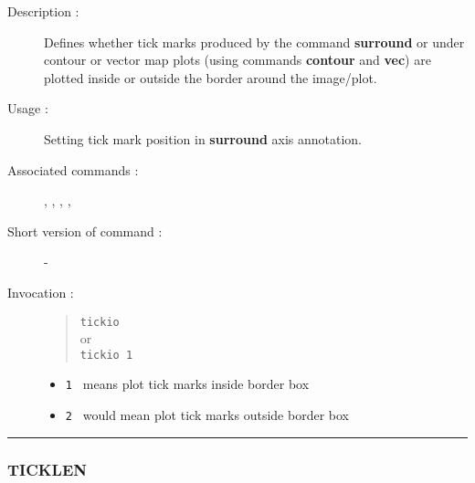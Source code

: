 \begin{description}

\item[Description :] Defines whether tick marks produced by the command 
{\bf surround} or under contour or vector map plots (using commands 
{\bf contour} and {\bf vec}) are plotted inside or outside the border 
around the image/plot.

\item[Usage :] Setting tick mark position in {\bf surround} axis annotation.

\item[Associated commands :] {\tt {}}, 
{\tt {}}, {\tt {}}, 
{\tt {}}, {\tt {}}

\item[Short version of command :] -
\item[Invocation :]

\begin{quote}{\tt  tickio }\\
or \\
{\tt tickio 1 }
\end{quote}

\begin{itemize}

\item {\tt 1 } means plot tick marks inside border box
\item {\tt 2 } would mean plot tick marks outside border box
\end{itemize}

\end{description}

\hrule 
\subsubsection*{\label{TICKLEN}TICKLEN}

